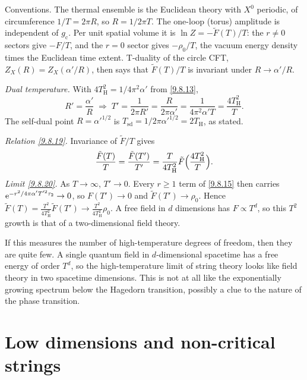 \begin{tcolorbox}[breakable]
	\begin{remark}
		Conventions. The thermal ensemble is the Euclidean theory with $X^0$ periodic, of circumference $1/T=2\pi R$, so $R=1/2\pi T$. The one-loop (torus) amplitude is independent of $g_{\mathrm c}$. Per unit spatial volume it is $\ln Z=-\tilde F(T)/T$: the $r\ne0$ sectors give $-F/T$, and the $r=0$ sector gives $-\rho_0/T$, the vacuum energy density times the Euclidean time extent. T-duality of the circle CFT, $Z_X(R)=Z_X(\alpha'/R)$, then says that $\tilde F(T)/T$ is invariant under $R\to\alpha'/R$.

		\emph{Dual temperature.} With $4T_{\mathrm H}^2=1/4\pi^2\alpha'$ from \eqref{9.8.13},
		\begin{equation*}
			R'=\frac{\alpha'}{R}\;\Longrightarrow\;T'=\frac{1}{2\pi R'}=\frac{R}{2\pi\alpha'}=\frac{1}{4\pi^2\alpha'T}=\frac{4T_{\mathrm H}^2}{T} .
		\end{equation*}
		The self-dual point $R=\alpha'^{1/2}$ is $T_{\mathrm{sd}}=1/2\pi\alpha'^{1/2}=2T_{\mathrm H}$, as stated.

		\emph{Relation \eqref{9.8.19}.} Invariance of $\tilde F/T$ gives
		\begin{equation*}
			\frac{\tilde F(T)}{T}=\frac{\tilde F(T')}{T'}=\frac{T}{4T_{\mathrm H}^2}\tilde F\Bigl(\frac{4T_{\mathrm H}^2}{T}\Bigr).
		\end{equation*}
		\emph{Limit \eqref{9.8.20}.} As $T\to\infty$, $T'\to0$. Every $r\ge1$ term of \eqref{9.8.15} then carries $\mathrm{e}^{-r^2/4\pi\alpha'T'^2\tau_2}\to0$, so $F(T')\to0$ and $\tilde F(T')\to\rho_0$. Hence $\tilde F(T)=\frac{T^2}{4T_{\mathrm H}^2}\tilde F(T')\to\frac{T^2}{4T_{\mathrm H}^2}\rho_0$. A free field in $d$ dimensions has $F\propto T^d$, so this $T^2$ growth is that of a two-dimensional field theory.
	\end{remark}
\end{tcolorbox}
If this measures the number of high-temperature degrees of freedom, then they are quite few. A single quantum field in $d$-dimensional spacetime has a free energy of order $T^{d}$, so the high-temperature limit of string theory looks like field theory in two spacetime dimensions.
This is not at all like the exponentially growing spectrum below the Hagedorn transition, possibly a clue to the nature of the phase transition.

\section{Low dimensions and non-critical strings}  \label{sec:9.9}

